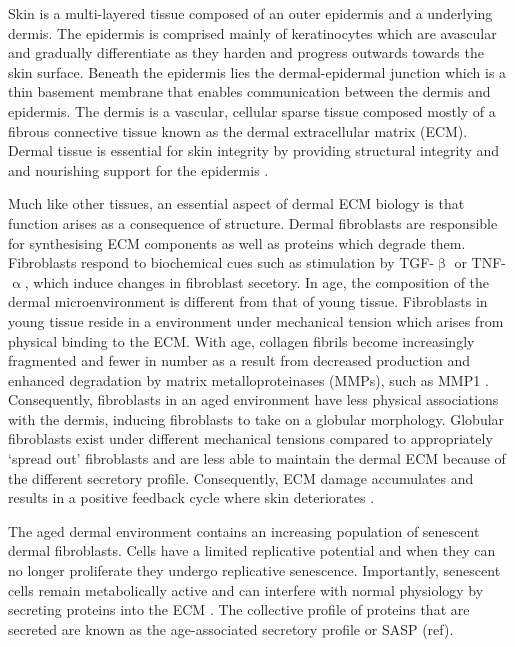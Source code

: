 \documentclass[alpha-refs]{wiley-article}
\newcommand{\tgf}{TGF-$\upbeta$}
\begin{document}
Skin is a multi-layered tissue composed of an outer epidermis and a underlying dermis. The epidermis is comprised mainly of keratinocytes which are avascular and gradually differentiate as they harden and progress outwards towards the skin surface. Beneath the epidermis lies the dermal-epidermal junction which is a thin basement membrane that enables communication between the dermis and epidermis. The dermis is a vascular, cellular sparse tissue composed mostly of a fibrous connective tissue known as the dermal extracellular matrix (ECM). Dermal tissue is essential for skin integrity by providing structural integrity and and nourishing support for the epidermis \citep{Lu2011}. 

Much like other tissues, an essential aspect of dermal ECM biology is that function arises as a consequence of structure. Dermal fibroblasts are responsible for synthesising ECM components as well as proteins which degrade them. Fibroblasts respond to biochemical cues such as stimulation by \tgf{} or TNF-$\upalpha$, which induce changes in fibroblast secetory. In age, the composition of the dermal microenvironment is different from that of young tissue. Fibroblasts in young tissue reside in a environment under mechanical tension which arises from physical binding to the ECM. With age, collagen fibrils become increasingly fragmented and fewer in number as a result from decreased production and enhanced degradation by matrix metalloproteinases (MMPs), such as MMP1 \citep{Fisher2008, Quan2015, Fisher2009, Varani2006}. Consequently, fibroblasts in an aged environment have less physical associations with the dermis, inducing fibroblasts to take on a globular morphology. Globular fibroblasts exist under different mechanical tensions compared to appropriately `spread out' fibroblasts and are less able to maintain the dermal ECM because of the different secretory profile. Consequently, ECM damage accumulates and results in a positive feedback cycle where skin deteriorates \citep{Fisher2008, Cole2018, Quan2015, Fisher2009, Varani2006}.

The aged dermal environment contains an increasing population of senescent dermal fibroblasts. Cells have a limited replicative potential and when they can no longer proliferate they undergo replicative senescence. Importantly, senescent cells remain metabolically active and can interfere with normal physiology by secreting proteins into the ECM \citep{Toutfaire2017}. The collective profile of proteins that are secreted are known as the age-associated secretory profile or SASP (ref). 
\end{document}
